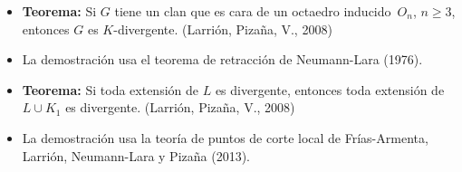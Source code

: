 \documentclass[beamer]{standalone}
\begin{document}
\begin{standaloneframe}
  \begin{itemize}
  \item \textbf{Teorema:} Si $G$ tiene un clan que es cara de un
    octaedro inducido~$O_{n}$, $n\geq3$, entonces $G$ es
    $K$-divergente. (Larrión, Pizaña, V., 2008)\pause
  \item La demostración usa el teorema de retracción de Neumann-Lara (1976).\pause
  \item \textbf{Teorema:} Si toda extensión de $L$ es divergente,
    entonces toda extensión de $L\cup K_{1}$ es divergente. (Larrión,
    Pizaña, V., 2008)\pause
  \item La demostración usa la teoría de puntos de corte local de
    Frías-Armenta, Larrión, Neumann-Lara y Pizaña (2013).
  \end{itemize}
\end{standaloneframe}
\end{document}
